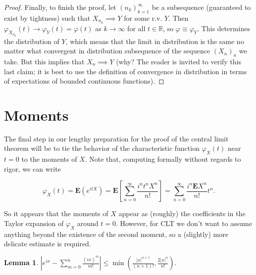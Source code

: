 \documentclass[11pt]{report}
\newcommand{\R}{\mathbb{R}}
\theoremstyle{plain}
\newtheorem{lem}[thm]{Lemma}
\theoremstyle{definition}
\begin{document}
\begin{proof}
Finally, to finish the proof, let $(n_k)_{k=1}^\infty$
be a subsequence (guaranteed to exist by tightness)
such that $X_{n_k}\implies Y$ for some r.v. $Y$. Then
$\varphi_{X_{n_k}}(t)\to \varphi_Y(t)=\varphi(t)$ as
$k\to\infty$ for all $t\in\R$, so
$\varphi\equiv\varphi_Y$. This determines the
distribution of $Y$, which means that the limit in
distribution is the same no matter what convergent in
distribution subsequence of the sequence $(X_n)_n$ we
take. But this implies that $X_n\implies Y$ (why? The
reader is invited to verify this last claim; it is
best to use the definition of convergence in
distribution in terms of expectations of bounded
continuous functions).
\end{proof}

\section{Moments}

The final step in our lengthy preparation for the
proof of the central limit theorem will be to tie the
behavior of the characteristic function $\varphi_X(t)$
near $t=0$ to the moments of $X$. Note that,
computing formally without regards to rigor, we can
write

\[
\varphi_X(t) = \mathbf{E} (e^{itX}) = \mathbf{E}\left[\sum_{n=0}^\infty \frac{i^n t^n X^n}{n!} \right]
= \sum_{n=0}^\infty \frac{i^n \mathbf{E} X^n}{n!} t^n.
\]

\noindent So it appears that the moments of $X$ appear as
(roughly) the coefficients in the Taylor expansion of
$\varphi_X$ around $t=0$. However, for CLT we don't
want to assume anything beyond the existence of the
second moment, so a (slightly) more delicate estimate
is required.

\begin{lem}
\label{lem-taylor-estimate}
$\left|e^{ix}-\sum_{m=0}^n \frac{(ix)^m}{m!}\right|
\le
\min\left(\frac{|x|^{n+1}}{(n+1)!},\frac{2|x|^n}{n!}\right).$
\end{lem}
\end{document}
